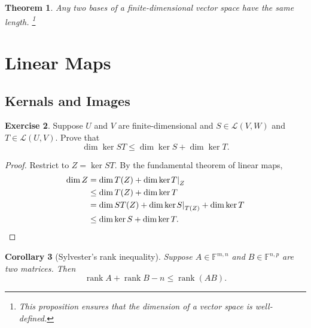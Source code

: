 \documentclass[nofonts,colorlinks]{tufte-handout}
\theoremstyle{plain} %
\newtheorem{thm}{Theorem}
\newtheorem{cor}[thm]{Corollary}
\theoremstyle{definition}
\newtheorem{exer}[thm]{Exercise}
\theoremstyle{remark}
\newcommand{\bra}[1]{\mathopen{}\left(#1\right)}
\newcommand{\rest}[2]{\mathopen{}\left.#1\right|_{#2}}
\newcommand{\F}{\mathbb{F}}
\renewcommand{\L}{\mathcal{L}}
\DeclareMathOperator{\rank}{rank}
\begin{document}
\begin{thm}
	Any two bases of a finite-dimensional vector space have the same length.%
	\footnote{This proposition ensures that the \emph{dimension} of a vector space is well-defined.}
\end{thm}


\section{Linear Maps}
\subsection{Kernals and Images}
\begin{exer}
	Suppose $U$ and $V$ are finite-dimensional and $S\in\L\bra{V,W}$ and $T\in\L\bra{U,V}$. Prove that
	\[\dim\ker ST \leq \dim\ker S + \dim\ker T.\]
\end{exer}
\begin{proof}
	Restrict to $Z=\ker ST$. By the fundamental theorem of linear maps,
	\begin{align*}
		\dim Z & = \dim T(Z) + \dim\ker \rest{T}{Z} \\
		& \leq \dim T(Z) + \dim\ker T \\
		& = \dim ST(Z) + \dim\ker \rest{S}{T(Z)} + \dim\ker T \\
		& \leq \dim\ker S + \dim\ker T.\qedhere
	\end{align*}
\end{proof}

\begin{cor}[Sylvester's rank inequality]
	Suppose $A\in\F^{m,n}$ and $B\in\F^{n,p}$ are two matrices. Then%
	\[\rank A+\rank B-n\leq\rank\bra{AB}.\]
\end{cor}
\end{document}
